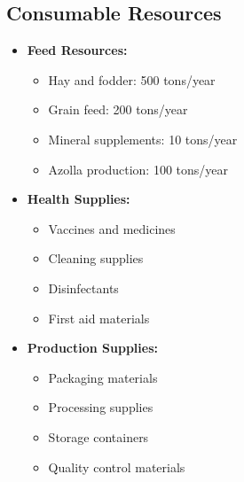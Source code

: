 \subsection{Consumable Resources}
\begin{itemize}
    \item \textbf{Feed Resources:}
    \begin{itemize}
        \item Hay and fodder: 500 tons/year
        \item Grain feed: 200 tons/year
        \item Mineral supplements: 10 tons/year
        \item Azolla production: 100 tons/year
    \end{itemize}
    
    \item \textbf{Health Supplies:}
    \begin{itemize}
        \item Vaccines and medicines
        \item Cleaning supplies
        \item Disinfectants
        \item First aid materials
    \end{itemize}
    
    \item \textbf{Production Supplies:}
    \begin{itemize}
        \item Packaging materials
        \item Processing supplies
        \item Storage containers
        \item Quality control materials
    \end{itemize}
\end{itemize}

